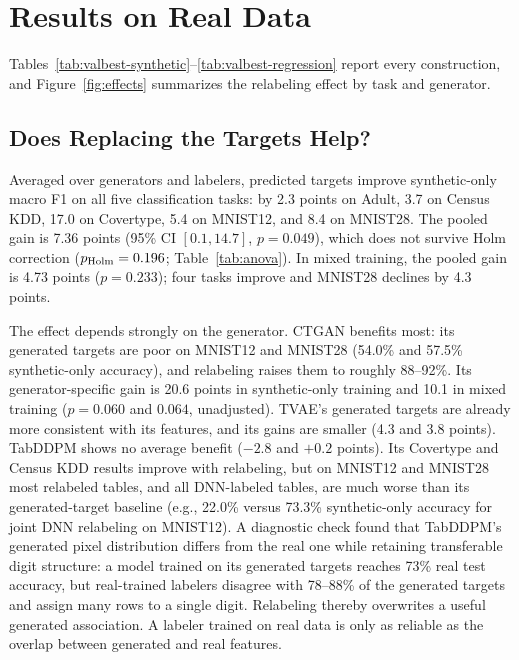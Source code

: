 \documentclass[letterpaper]{article}
\begin{document}
\section{Results on Real Data}





Tables~\ref{tab:valbest-synthetic}--\ref{tab:valbest-regression} report every
construction, and Figure~\ref{fig:effects} summarizes the relabeling effect
by task and generator.

\subsection{Does Replacing the Targets Help?}
Averaged over generators and labelers, predicted targets improve
synthetic-only macro F1 on all five classification tasks: by 2.3 points on
Adult, 3.7 on Census KDD, 17.0 on Covertype, 5.4 on MNIST12, and 8.4 on
MNIST28. The pooled gain is 7.36 points (95\% CI $[0.1, 14.7]$, $p=0.049$),
which does not survive Holm correction ($p_{\rm Holm}=0.196$;
Table~\ref{tab:anova}). In mixed training, the pooled gain is 4.73 points
($p=0.233$); four tasks improve and MNIST28 declines by 4.3 points.

The effect depends strongly on the generator. CTGAN benefits most: its
generated targets are poor on MNIST12 and MNIST28 (54.0\% and 57.5\%
synthetic-only accuracy), and relabeling raises them to roughly 88--92\%.
Its generator-specific gain is 20.6 points in synthetic-only training and
10.1 in mixed training ($p=0.060$ and $0.064$, unadjusted). TVAE's
generated targets are already more consistent with its features, and its
gains are smaller (4.3 and 3.8 points). TabDDPM shows no average benefit
($-2.8$ and $+0.2$ points). Its Covertype and Census KDD results improve
with relabeling, but on MNIST12 and MNIST28 most relabeled tables, and
all DNN-labeled tables, are much worse than its generated-target baseline
(e.g., 22.0\% versus 73.3\% synthetic-only accuracy for joint DNN
relabeling on MNIST12). A diagnostic check found that TabDDPM's generated
pixel distribution differs from the real one while retaining transferable
digit structure: a model trained on its generated targets reaches 73\% real
test accuracy, but real-trained labelers disagree with 78--88\% of the
generated targets and assign many rows to a single digit. Relabeling
thereby overwrites a useful generated association. A labeler trained on
real data is only as reliable as the overlap between generated and real
features.
\end{document}
